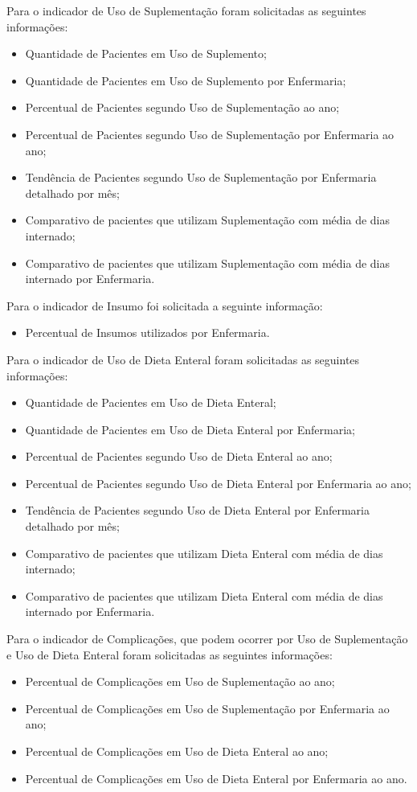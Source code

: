Para o indicador de Uso de Suplementação foram solicitadas as seguintes informações:
\begin{itemize}
    \item Quantidade de Pacientes em Uso de Suplemento;
    \item Quantidade de Pacientes em Uso de Suplemento por Enfermaria;
    \item Percentual de Pacientes segundo Uso de Suplementação ao ano;
    \item Percentual de Pacientes segundo Uso de Suplementação por Enfermaria ao ano;
    \item Tendência de Pacientes segundo Uso de Suplementação por Enfermaria detalhado por mês;
    \item Comparativo de pacientes que utilizam Suplementação com média de dias internado;
    \item Comparativo de pacientes que utilizam Suplementação com média de dias internado por Enfermaria.
\end{itemize}

Para o indicador de Insumo foi solicitada a seguinte informação:
\begin{itemize}
    \item Percentual de Insumos utilizados por Enfermaria.
\end{itemize}

Para o indicador de Uso de Dieta Enteral foram solicitadas as seguintes informações:
\begin{itemize}
    \item Quantidade de Pacientes em Uso de Dieta Enteral;
    \item Quantidade de Pacientes em Uso de Dieta Enteral por Enfermaria;
    \item Percentual de Pacientes segundo Uso de Dieta Enteral ao ano;
    \item Percentual de Pacientes segundo Uso de Dieta Enteral por Enfermaria ao ano;
    \item Tendência de Pacientes segundo Uso de Dieta Enteral por Enfermaria detalhado por mês;
    \item Comparativo de pacientes que utilizam Dieta Enteral com média de dias internado;
    \item Comparativo de pacientes que utilizam Dieta Enteral com média de dias internado por Enfermaria.
\end{itemize}

Para o indicador de Complicações, que podem ocorrer por Uso de Suplementação e Uso de Dieta Enteral foram solicitadas as seguintes informações:
\begin{itemize}
    \item Percentual de Complicações em Uso de Suplementação ao ano;
    \item Percentual de Complicações em Uso de Suplementação por Enfermaria ao ano;
    \item Percentual de Complicações em Uso de Dieta Enteral ao ano;
    \item Percentual de Complicações em Uso de Dieta Enteral por Enfermaria ao ano.
\end{itemize}

